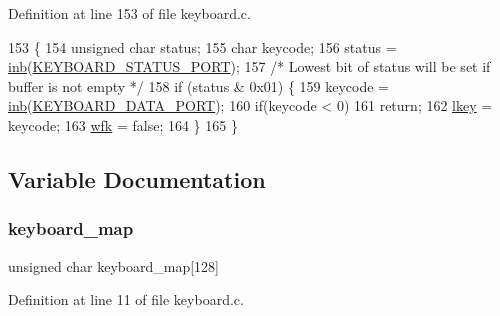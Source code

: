 Definition at line 153 of file keyboard.\+c.


\begin{DoxyCode}
153                                  \{
154     \textcolor{keywordtype}{unsigned} \textcolor{keywordtype}{char} status;
155     \textcolor{keywordtype}{char} keycode;
156     status = \hyperlink{a00164_a0223c8898dfec29069879dc51076e28a_a0223c8898dfec29069879dc51076e28a}{inb}(\hyperlink{a00041_ab79ca089665bc7f5cc151883d1bc69ed_ab79ca089665bc7f5cc151883d1bc69ed}{KEYBOARD\_STATUS\_PORT});
157     \textcolor{comment}{/* Lowest bit of status will be set if buffer is not empty */}
158     \textcolor{keywordflow}{if} (status & 0x01) \{
159         keycode = \hyperlink{a00164_a0223c8898dfec29069879dc51076e28a_a0223c8898dfec29069879dc51076e28a}{inb}(\hyperlink{a00041_a49e0a04e81098085d2948c1e9f8c99cb_a49e0a04e81098085d2948c1e9f8c99cb}{KEYBOARD\_DATA\_PORT});
160         \textcolor{keywordflow}{if}(keycode < 0)
161             \textcolor{keywordflow}{return};
162         \hyperlink{a00038_ade374650022cb30c4f5591a8dafad685_ade374650022cb30c4f5591a8dafad685}{lkey} = keycode;
163         \hyperlink{a00038_a6ddd5223379778858edc46ffbec19775_a6ddd5223379778858edc46ffbec19775}{wfk} = \textcolor{keyword}{false};
164     \}
165 \}
\end{DoxyCode}


\subsection{Variable Documentation}
\mbox{\label{a00038_a5d0b5e007d1b57bf84d1c03439810533_a5d0b5e007d1b57bf84d1c03439810533}} 
\subsubsection{\texorpdfstring{keyboard\+\_\+map}{keyboard\_map}}
{\footnotesize\ttfamily unsigned char keyboard\+\_\+map\mbox{[}128\mbox{]}}



Definition at line 11 of file keyboard.\+c.

\mbox{\label{a00038_ade374650022cb30c4f5591a8dafad685_ade374650022cb30c4f5591a8dafad685}} 
